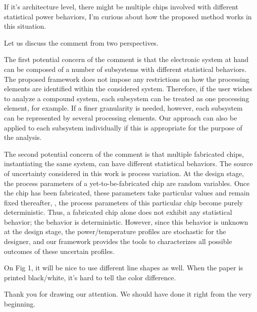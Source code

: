 \begin{reviewer}
If it’s architecture level, there might be multiple chips involved with different statistical power behaviors, I’m curious about how the proposed method works in this situation.
\end{reviewer}
\begin{authors}
Let us discuss the comment from two perspectives.

The first potential concern of the comment is that the electronic system at hand can be composed of a number of subsystems with different statistical behaviors.
The proposed framework does not impose any restrictions on how the processing elements are identified within the considered system.
Therefore, if the user wishes to analyze a compound system, each subsystem can be treated as one processing element, for example.
If a finer granularity is needed, however, each subsystem can be represented by several processing elements.
Our approach can also be applied to each subsystem individually if this is appropriate for the purpose of the analysis.

The second potential concern of the comment is that multiple fabricated chips, instantiating the same system, can have different statistical behaviors.
The source of uncertainty considered in this work is process variation.
At the design stage, the process parameters of a yet-to-be-fabricated chip are random variables.
Once the chip has been fabricated, these parameters take particular values and remain fixed thereafter, \ie, the process parameters of this particular chip become purely deterministic.
Thus, a fabricated chip alone does not exhibit any statistical behavior; the behavior is deterministic.
However, since this behavior is unknown at the design stage, the power/temperature profiles are stochastic for the designer, and our framework provides the tools to characterizes all possible outcomes of these uncertain profiles.

\begin{actions}
\end{actions}
\end{authors}

\begin{reviewer}
On Fig 1, it will be nice to use different line shapes as well. When the paper is printed black/white, it’s hard to tell the color difference.
\end{reviewer}
\begin{authors}
Thank you for drawing our attention.
We should have done it right from the very beginning.

\begin{actions}
\end{actions}
\end{authors}
